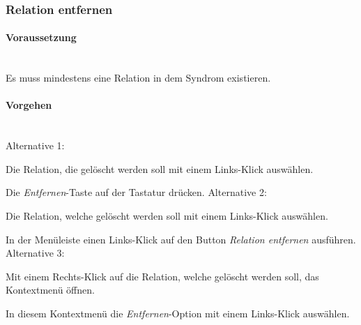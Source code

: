 \documentclass[enabledeprecatedfontcommands,fontsize=11pt,paper=a4,twoside]{scrartcl}
\newcommand*{\condition}{\paragraph{Voraussetzung}$\;$ \vspace{0.2cm}\\}
\newcommand*{\actions}{\paragraph{Vorgehen} $\;$\vspace{0.2cm}\\}
\newcommand*{\aOne}{\textcolor{bbe}{Alternative 1:}}
\newcommand*{\aTwo}{\textcolor{bbe}{Alternative 2:}}
\newcommand*{\aThree}{\textcolor{bbe}{Alternative 3:}}
\let\origenumerate\enumerate
\let\origendenumerate\endenumerate
\renewenvironment{enumerate}{\origenumerate \addtolength{\itemsep}{-10.0pt}}{\origendenumerate}
\begin{document}
		\subsubsection{Relation entfernen}
		\condition
		Es muss mindestens eine Relation in dem Syndrom existieren. 
		\actions
		\aOne
		\begin{enumerate}
			\item Die Relation, die gelöscht werden soll mit einem Links-Klick auswählen.
			\item Die \textit{Entfernen}-Taste auf der Tastatur drücken.
		\end{enumerate}
		\aTwo
		\begin{enumerate}
			\item Die Relation, welche gelöscht werden soll mit einem Links-Klick auswählen.
			\item In der Menüleiste einen Links-Klick auf den Button \textit{Relation entfernen} ausführen.
		\end{enumerate}
		\aThree
		\begin{enumerate}
			\item Mit einem Rechts-Klick auf die Relation, welche gelöscht werden soll, das Kontextmenü öffnen. 
			\item In diesem Kontextmenü die \textit{Entfernen}-Option mit einem Links-Klick auswählen. \\
		\end{enumerate}
		
\end{document}

